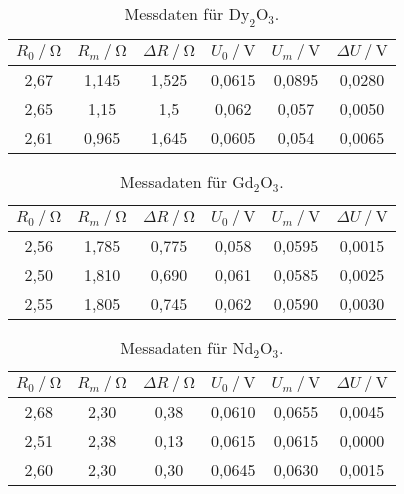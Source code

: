 \begin{table}[H]
    \centering
    \caption{Messdaten für $\text{Dy}_2 \text{O}_3$.}
    \label{tab:tab3}
    \begin{tabular}{S S S S S S}
      \toprule
        {$ R_0 \mathbin{/} \unit{\ohm} $}&{$R_m \mathbin{/} \unit{\ohm} $}&{$ \Delta R \mathbin{/} \unit{\ohm}$}&{$ U_0 \mathbin{/} \unit{\volt}$}&{$U_m \mathbin{/} \unit{\volt}$}&{$\Delta U \mathbin{/} \unit{\volt}$}\\
        \midrule
        {2,67} & {1,145}&  {1,525}&{0,0615}&{0,0895}&{0,0280}\\
        {2,65} & {1,15} &  {1,5}  &{0,062} &{0,057} &{0,0050}\\
        {2,61} & {0,965}&  {1,645}&{0,0605}&{0,054} &{0,0065}\\
      \bottomrule
    \end{tabular}
\end{table}

\begin{table}[H]
    \centering
    \caption{Messadaten für $\text{Gd}_2 \text{O}_3$.}
    \label{tab:tab4}
    \begin{tabular}{S S S S S S}
      \toprule
        {$ R_0 \mathbin{/} \unit{\ohm} $}&{$R_m \mathbin{/} \unit{\ohm} $}&{$ \Delta R \mathbin{/} \unit{\ohm}$}&{$ U_0 \mathbin{/} \unit{\volt}$}&{$U_m \mathbin{/} \unit{\volt}$}&{$\Delta U \mathbin{/} \unit{\volt}$}\\
        \midrule
        {2,56} & {1,785}&  {0,775}&{0,058}&{0,0595}&{0,0015}\\
        {2,50} & {1,810}&  {0,690}&{0,061}&{0,0585}&{0,0025}\\
        {2,55} & {1,805}&  {0,745}&{0,062}&{0,0590}&{0,0030}\\
      \bottomrule
    \end{tabular}
\end{table}

\begin{table}[H]
    \centering
    \caption{Messadaten für $\text{Nd}_2 \text{O}_3$.}
    \label{tab:tab5}
    \begin{tabular}{S S S S S S}
      \toprule
        {$ R_0 \mathbin{/} \unit{\ohm} $}&{$R_m \mathbin{/} \unit{\ohm} $}&{$ \Delta R \mathbin{/} \unit{\ohm}$}&{$ U_0 \mathbin{/} \unit{\volt}$}&{$U_m \mathbin{/} \unit{\volt}$}&{$\Delta U \mathbin{/} \unit{\volt}$}\\
        \midrule
        {2,68} & {2,30} &  {0,38}&{0,0610}&{0,0655}&{0,0045}\\
        {2,51} & {2,38} &  {0,13}&{0,0615}&{0,0615}&{0,0000}\\
        {2,60} & {2,30} &  {0,30}&{0,0645}&{0,0630}&{0,0015}\\
        \bottomrule
    \end{tabular}
\end{table}

